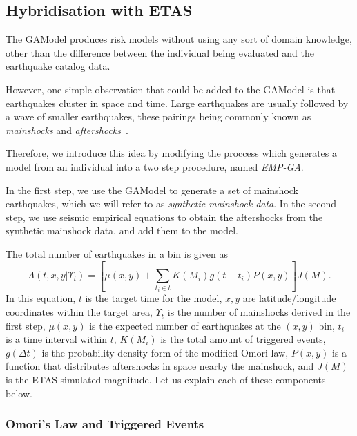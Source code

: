 \subsection{Hybridisation with ETAS}

The GAModel produces risk models without using any sort of domain
knowledge, other than the difference between the individual being
evaluated and the earthquake catalog data.

However, one simple observation that could be added to the GAModel is
that earthquakes cluster in space and time. Large earthquakes are
usually followed by a wave of smaller earthquakes, these pairings
being commonly known as \emph{mainshocks} and
\emph{aftershocks}~\cite{schorlemmer2010first}.

Therefore, we introduce this idea by modifying the proccess which
generates a model from an individual into a two step procedure, named
\emph{EMP-GA}.

In the first step, we use the GAModel to generate a set of mainshock
earthquakes, which we will refer to as \emph{synthetic mainshock
  data}. In the second step, we use seismic empirical equations to
obtain the aftershocks from the synthetic mainshock data, and add them
to the model.

The total number of earthquakes in a bin is given as
\begin{equation}\label{emp-model}
 \Lambda(t,x,y|\Upsilon_t) = [\mu(x,y) + \displaystyle\sum_{t_i \in t}
   K(M_i)g(t-t_i)P(x,y)]J(M).
\end{equation}
In this equation, $t$ is the target time for the model, $x,y$ are
latitude/longitude coordinates within the target area, $\Upsilon_t$ is
the number of mainshocks derived in the first step, $\mu(x,y)$ is the
expected number of earthquakes at the $(x,y)$ bin, $t_i$ is a time
interval within $t$, $K(M_i)$ is the total amount of triggered events,
$g(\Delta t)$ is the probability density form of the modified Omori
law, $P(x,y)$ is a function that distributes aftershocks in space
nearby the mainshock, and $J(M)$ is the ETAS simulated magnitude. Let
us explain each of these components below.

\subsubsection*{Omori's Law and Triggered Events}

